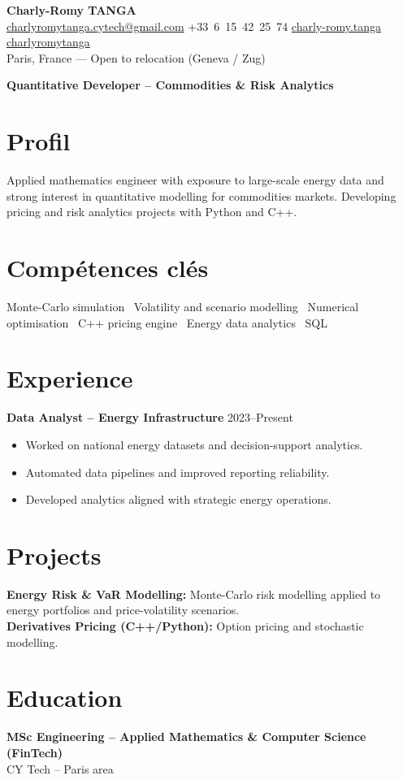 \documentclass[10pt, letterpaper]{article}
\begin{document}
\begin{center}
\textbf{\LARGE Charly-Romy TANGA}\\[0.15cm]
\mbox{\href{mailto:charlyromytanga.cytech@gmail.com}{\footnotesize\faEnvelope\hspace*{0.1cm}charlyromytanga.cytech@gmail.com}}\kern0.25cm
\mbox{\faPhone\hspace*{0.1cm}+33 6 15 42 25 74}\kern0.25cm
\mbox{\href{https://www.linkedin.com/in/charly-romy-tanga}{\footnotesize\faLinkedin\hspace*{0.1cm}charly-romy.tanga}}\kern0.25cm
\mbox{\href{https://github.com/charlyromytanga}{\footnotesize\faGithub\hspace*{0.1cm}charlyromytanga}}\\[0.15cm]
Paris, France --- Open to relocation (Geneva / Zug)
\end{center}
\textbf{Quantitative Developer -- Commodities \& Risk Analytics}
\section*{Profil}
Applied mathematics engineer with exposure to large-scale energy data and strong interest in quantitative modelling for commodities markets. Developing pricing and risk analytics projects with Python and C++.
\section*{Compétences clés}
Monte-Carlo simulation \textbullet\ Volatility and scenario modelling \textbullet\ Numerical optimisation \textbullet\ C++ pricing engine \textbullet\ Energy data analytics \textbullet\ SQL
\section*{Experience}
\textbf{Data Analyst -- Energy Infrastructure} \hfill 2023--Present
\begin{itemize}[leftmargin=0.45cm,itemsep=1pt,topsep=2pt]
\item Worked on national energy datasets and decision-support analytics.
\item Automated data pipelines and improved reporting reliability.
\item Developed analytics aligned with strategic energy operations.
\end{itemize}
\section*{Projects}
\textbf{Energy Risk \& VaR Modelling:} Monte-Carlo risk modelling applied to energy portfolios and price-volatility scenarios.\\
\textbf{Derivatives Pricing (C++/Python):} Option pricing and stochastic modelling.
\section*{Education}
\textbf{MSc Engineering -- Applied Mathematics \& Computer Science (FinTech)}\\CY Tech -- Paris area
\end{document}

